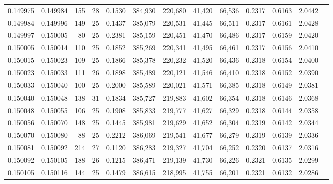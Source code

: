 \begin{tabular}{rrrrrrrrrrrrr}
0.149975 & 0.149984 & 155 &  28 &                                     0.1530 & 384,930 & 220,680 &  41,420 &  66,536 & 0.2317 & 0.6163 & 2.0442 \\
0.149984 & 0.149996 & 149 &  25 &                                     0.1437 & 385,079 & 220,531 &  41,445 &  66,511 & 0.2317 & 0.6161 & 2.0428 \\
0.149997 & 0.150005 &  80 &  25 &                                     0.2381 & 385,159 & 220,451 &  41,470 &  66,486 & 0.2317 & 0.6159 & 2.0420 \\
0.150005 & 0.150014 & 110 &  25 &                                     0.1852 & 385,269 & 220,341 &  41,495 &  66,461 & 0.2317 & 0.6156 & 2.0410 \\
0.150015 & 0.150023 & 109 &  25 &                                     0.1866 & 385,378 & 220,232 &  41,520 &  66,436 & 0.2318 & 0.6154 & 2.0400 \\
0.150023 & 0.150033 & 111 &  26 &                                     0.1898 & 385,489 & 220,121 &  41,546 &  66,410 & 0.2318 & 0.6152 & 2.0390 \\
0.150033 & 0.150040 & 100 &  25 &                                     0.2000 & 385,589 & 220,021 &  41,571 &  66,385 & 0.2318 & 0.6149 & 2.0381 \\
0.150040 & 0.150048 & 138 &  31 &                                     0.1834 & 385,727 & 219,883 &  41,602 &  66,354 & 0.2318 & 0.6146 & 2.0368 \\
0.150048 & 0.150055 & 106 &  25 &                                     0.1908 & 385,833 & 219,777 &  41,627 &  66,329 & 0.2318 & 0.6144 & 2.0358 \\
0.150056 & 0.150070 & 148 &  25 &                                     0.1445 & 385,981 & 219,629 &  41,652 &  66,304 & 0.2319 & 0.6142 & 2.0344 \\
0.150070 & 0.150080 &  88 &  25 &                                     0.2212 & 386,069 & 219,541 &  41,677 &  66,279 & 0.2319 & 0.6139 & 2.0336 \\
0.150081 & 0.150092 & 214 &  27 &                                     0.1120 & 386,283 & 219,327 &  41,704 &  66,252 & 0.2320 & 0.6137 & 2.0316 \\
0.150092 & 0.150105 & 188 &  26 &                                     0.1215 & 386,471 & 219,139 &  41,730 &  66,226 & 0.2321 & 0.6135 & 2.0299 \\
0.150105 & 0.150116 & 144 &  25 &                                     0.1479 & 386,615 & 218,995 &  41,755 &  66,201 & 0.2321 & 0.6132 & 2.0286 \\

\end{tabular}
